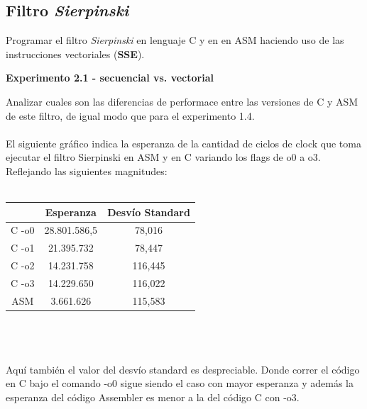 \subsection{Filtro \textit{Sierpinski}}

Programar el filtro \textit{Sierpinski} en lenguaje C y en en ASM haciendo 
uso de las instrucciones vectoriales (\textbf{SSE}).

\vspace*{0.3cm} \noindent
\textbf{Experimento 2.1 - secuencial vs. vectorial}

Analizar cuales son las diferencias de performace entre las versiones de C 
y ASM de este filtro, de igual modo que para el experimento 1.4. \\
\\
El siguiente gr\'afico indica la esperanza de la cantidad de ciclos de clock que toma ejecutar el filtro Sierpinski en ASM y en C variando los flags de o0 a o3. \\
Reflejando las siguientes magnitudes: \\
\\
 \begin{tabular}[c]{|c|c|c|}
	\hline
		 & Esperanza & Desv\'io Standard\\
		\hline
C -o0 & 28.801.586,5 & 78,016 \\
\hline
C -o1 & 21.395.732 & 78,447 \\
\hline
C -o2 & 14.231.758 & 116,445 \\
\hline
C -o3 & 14.229.650 & 116,022 \\
\hline
ASM & 3.661.626 & 115,583 \\
\hline
	\end{tabular}\\\\
\\
Aqu\'i tambi\'en el valor del desv\'io standard es despreciable. Donde correr el c\'odigo en C bajo el comando -o0 sigue siendo el caso con mayor esperanza y adem\'as la esperanza del c\'odigo Assembler es menor a la del c\'odigo C con -o3.\\
\newpage
